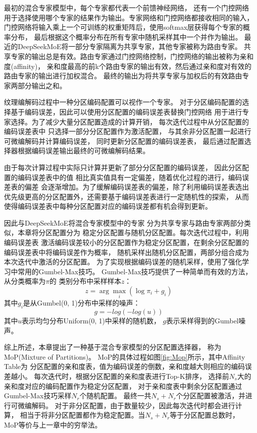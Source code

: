最初的混合专家模型中，每个专家都代表一个前馈神经网络，
还有一个门控网络用于选择使用哪个专家的结果作为输出。专家网络和门控网络都接收相同的输入，
门控网络将输入乘上一个可训练的权重矩阵后，使用softmax层获得每个专家的概率分布，
最后根据这个概率分布在所有专家中随机采样其中一个并作为输出。
最近的DeepSeekMoE\cite{dai2024deepseekmoe}将一部分专家隔离为共享专家，其他专家被称为路由专家。
共享专家的输出总是有效。路由专家通过门控网络控制，门控网络的输出被称为亲和度(affinity)，
亲和度最高的前k个路由专家的输出有效，然后通过亲和度对有效的路由专家的输出进行加权混合。
最终的输出为将共享专家与加权后的有效路由专家两部分输出之和。

纹理编解码过程中一种分区编码配置可以视作一个专家。
对于分区编码配置的选择基于编码误差，因此可以使用分区配置的编码误差表替换门控网络
用于进行专家选择。为了减少大量分区配置造成的计算开销，
每次迭代过程中从分区配置的编码误差表中
只选择一部分分区配置作为激活配置，
与其余非分区配置一起进行可微编解码并计算编码误差，
同时更新分区配置的编码误差表，
最后通过配置选择器根据编码误差输出最终的可微编解码结果。

由于每次计算过程中实际只计算并更新了部分分区配置的编码误差，
因此分区配置的编码误差表中的值
相比真实值具有一定偏差，随着优化过程的进行，编码误差表的偏差
会逐渐增加。为了缓解编码误差表的偏差，除了利用编码误差表选出
优先级更高的分区配置外，还需要基于编码误差表进行一定随机性的探索，
从而使得编码误差表中每种分区配置对应的编码误差都有机会得到更新。

因此与DeepSeekMoE\cite{dai2024deepseekmoe}将混合专家模型中的专家
分为共享专家与路由专家两部分类似，本章将分区配置分为
稳定分区配置与随机分区配置。每次迭代过程中，利用编码误差表
激活编码误差较小的分区配置作为稳定分区配置，在剩余分区配置的编码误差表中将编码误差作为概率，
随机采样出随机分区配置，两部分组合成为本次迭代中激活的分区配置。
为了实现根据编码误差的随机采样，使用了强化学习中常用的Gumbel-Max技巧\cite{jang2016categorical}。
Gumbel-Max技巧提供了一种简单而有效的方法，从分类概率为$\pi$的
类别分布中采样样本$z$：
\begin{equation}
z = \arg\max_i \left( \log\pi_i + g_i \right)
\end{equation}
其中$g_i$是从Gumbel(0, 1)分布中采样的噪声：
\begin{equation}
    g = -log(-log(u))
\end{equation}
其中$u$表示均匀分布Uniform(0, 1)中采样的随机数，
$g$表示采样得到的Gumbel噪声。

综上所述，本章提出了一种基于混合专家模型的分区配置选择器，
称为MoP(Mixture of Partitions)。
MoP的具体过程如图\ref{fig:Mop}所示，其中Affinity Table为
分区配置的亲和度表，值为编码误差的倒数，亲和度越大则相应的编码误差越小。
每次迭代时，根据分区配置的亲和度表进行Top-K排序，
选择前$N_s$大的亲和度对应的编码配置作为稳定分区配置，
对于亲和度表中剩余分区配置通过Gumbel-Max技巧采样$N_r$个随机配置。
最终一共$N_s+N_r$个分区配置被激活，并进行可微编解码。
对于非分区配置，由于数量较少，因此每次迭代时都会进行计算，
相当于将非分区配置都作为稳定配置。当$N_s+N_r$等于分区配置总数时，
MoP等价与上一章中的穷举法。

